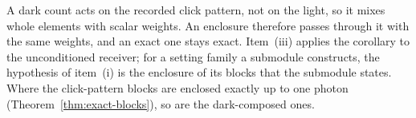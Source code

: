 
A dark count acts on the recorded click pattern, not on the light, so it
mixes whole elements with scalar weights. An enclosure therefore passes
through it with the same weights, and an exact one stays exact. Item~(iii)
applies the corollary to the unconditioned receiver; for a setting family a
submodule constructs, the hypothesis of item~(i) is the enclosure of its
blocks that the submodule states. Where the click-pattern blocks
are enclosed exactly up to one photon (Theorem~\ref{thm:exact-blocks}), so are
the dark-composed ones.

